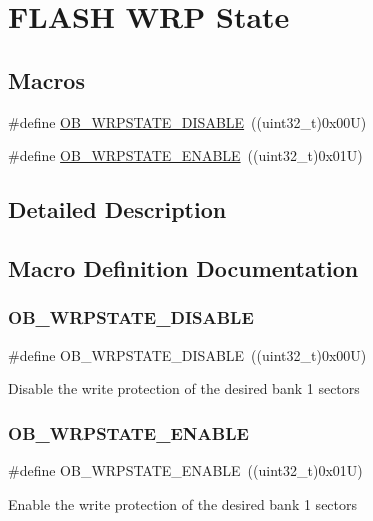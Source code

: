 \hypertarget{group___f_l_a_s_h_ex___w_r_p___state}{}\section{F\+L\+A\+SH W\+RP State}
\label{group___f_l_a_s_h_ex___w_r_p___state}
\subsection*{Macros}
\begin{DoxyCompactItemize}
\item 
\#define \mbox{\hyperlink{group___f_l_a_s_h_ex___w_r_p___state_gaa34eb6205fe554f65a311ee974d5a4ab}{O\+B\+\_\+\+W\+R\+P\+S\+T\+A\+T\+E\+\_\+\+D\+I\+S\+A\+B\+LE}}~((uint32\+\_\+t)0x00\+U)
\item 
\#define \mbox{\hyperlink{group___f_l_a_s_h_ex___w_r_p___state_ga9fc463145ab57616baa36d95523186a1}{O\+B\+\_\+\+W\+R\+P\+S\+T\+A\+T\+E\+\_\+\+E\+N\+A\+B\+LE}}~((uint32\+\_\+t)0x01\+U)
\end{DoxyCompactItemize}


\subsection{Detailed Description}


\subsection{Macro Definition Documentation}
\mbox{\label{group___f_l_a_s_h_ex___w_r_p___state_gaa34eb6205fe554f65a311ee974d5a4ab}} 
\subsubsection{\texorpdfstring{OB\_WRPSTATE\_DISABLE}{OB\_WRPSTATE\_DISABLE}}
{\footnotesize\ttfamily \#define O\+B\+\_\+\+W\+R\+P\+S\+T\+A\+T\+E\+\_\+\+D\+I\+S\+A\+B\+LE~((uint32\+\_\+t)0x00\+U)}

Disable the write protection of the desired bank 1 sectors \mbox{\label{group___f_l_a_s_h_ex___w_r_p___state_ga9fc463145ab57616baa36d95523186a1}} 
\subsubsection{\texorpdfstring{OB\_WRPSTATE\_ENABLE}{OB\_WRPSTATE\_ENABLE}}
{\footnotesize\ttfamily \#define O\+B\+\_\+\+W\+R\+P\+S\+T\+A\+T\+E\+\_\+\+E\+N\+A\+B\+LE~((uint32\+\_\+t)0x01\+U)}

Enable the write protection of the desired bank 1 sectors 